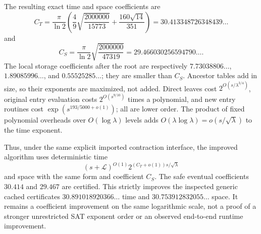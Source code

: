 The resulting exact time and space coefficients are
\[
\boxed{\displaystyle
 C_T=\frac\pi{\ln2}
 \left(\frac49\sqrt{\frac{2000000}{15773}}
            +\frac{160\sqrt{14}}{351}\right)
 =30.413348726348439\ldots}
\]
and
\[
\boxed{\displaystyle
 C_S=\frac\pi{\ln2}\sqrt{\frac{2000000}{47319}}
 =29.466030256594790\ldots.}
\]
The local storage coefficients after the root are respectively
$7.73038806\ldots$, $1.89085996\ldots$, and
$0.55525285\ldots$; they are smaller than $C_S$.
Ancestor tables add in size, so their exponents are maximized, not added.
Direct leaves cost $2^{O(s/\lambda^{3/4})}$, original entry evaluation
costs $2^{O(s^{9/10})}$ times a polynomial, and new entry routines cost
$\exp(s^{193/5000+o(1)})$; all are lower order.
The product of fixed polynomial overheads over $O(\log\lambda)$ levels
adds $O(\lambda\log\lambda)=o(s/\sqrt\lambda)$ to the time exponent.

Thus, under the same explicit imported contraction interface, the improved
algorithm uses deterministic time
\[
 (s+\mathcal L)^{O(1)}2^{(C_T+o(1))s/\sqrt\lambda}
\]
and space with the same form and coefficient $C_S$.
The safe eventual coefficients $30.414$ and $29.467$ are certified.
This strictly improves the inspected generic cached certificates
$30.891018920366\ldots$ time and $30.753912832055\ldots$ space.
It remains a coefficient improvement on the same logarithmic scale,
not a proof of a stronger unrestricted SAT exponent order or an observed
end-to-end runtime improvement.
